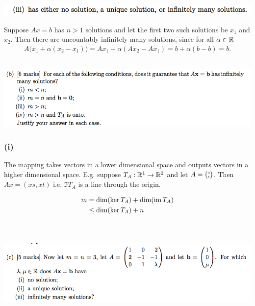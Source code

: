 \documentclass[12pt]{article}
\begin{document}
\subsubsection*{} %
\begin{mdframed}
\includegraphics[width=400pt]{img/oxford-prelims-2017-A-2-1-3.png}
\end{mdframed}

Suppose $Ax = b$ has $n > 1$ solutions and let the first two such solutions be
$x_1$ and $x_2$. Then there are uncountably infinitely many solutions, since
for all $\alpha \in \mathbb{R}$
\begin{align*}
A\Big(x_1 + \alpha (x_2 - x_1)\Big) = Ax_1 + \alpha(Ax_2 - Ax_1) = b + \alpha(b - b) = b.
\end{align*}

\subsection*{} %
\begin{mdframed}
\includegraphics[width=400pt]{img/oxford-prelims-2017-A-2-2.png}
\end{mdframed}

\subsubsection*{(i)} The mapping takes vectors in a lower dimensional space and
outputs vectors in a higher dimensional space. E.g. suppose $T_A:\mathbb{R}^1 \to \mathbb{R}^2$
and let $A = \tiny{\begin{pmatrix}s\\t\end{pmatrix}}$. Then $Ax = (xs, xt)$ i.e. $\Im T_A$ is a line
through the origin.

\begin{align*}
  m &=    \dim(\ker T_A) + \dim(\operatorname{\text{im}} T_A)\\
    &\leq \dim(\ker T_A) + n\\
\end{align*}
~\\
\subsection*{} %
\begin{mdframed}
\includegraphics[width=400pt]{img/oxford-prelims-2017-A-2-3.png}
\end{mdframed}
\end{document}
